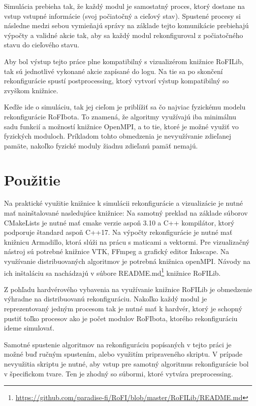 \documentclass[
  digital, %
  oneside, %
  table,   %
  lof,     %
  nolot,     %
]{fithesis3}
\begin{document}
Simulácia prebieha tak, že každý modul je samostatný proces, ktorý dostane na vstup vstupné informácie (svoj počiatočný a cieľový stav). Spustené procesy si následne medzi sebou vymieňajú správy na základe tejto komunikácie prebiehajú výpočty a validné akcie tak, aby sa každý modul rekonfiguroval z počiatočného stavu do cieľového stavu. 

Aby bol výstup tejto práce plne kompatibilný s vizualizérom knižnice RoFILib, tak sú jednotlivé vykonané akcie zapísané do logu. Na tie sa po skončení rekonfigurácie spustí postprocessing, ktorý vytvorí výstup kompatibilný so zvyškom knižnice. 

Keďže ide o simuláciu, tak jej cieľom je priblížiť sa čo najviac fyzickému modelu rekonfigurácie RoFIbota. To znamená, že algoritmy využívajú iba minimálnu sadu funkcií a možností knižnice OpenMPI, a to tie, ktoré je možné využiť vo fyzických moduloch. Príkladom tohto obmedzenia je nevyužívanie zdieľanej pamäte, nakoľko fyzické moduly žiadnu zdieľanú pamäť nemajú. 

\section{Použitie}
Na praktické využitie knižnice k simulácii rekonfigurácie a vizualizácie je nutné mať nainštalované nasledujúce knižnice: Na samotný preklad na základe súborov CMakeLists je nutné mať cmake verzie aspoň 3.10 a C++ kompilátor, ktorý podporuje štandard aspoň C++17. Na výpočty rekonfigurácie je nutné mať knižnicu Armadillo, ktorá slúži na prácu s maticami a vektormi. Pre vizualizačný nástroj sú potrebné knižnice VTK, FFmpeg a grafický editor Inkscape. Na využívanie distribuovaných algoritmov je potrebná knižnica openMPI. Návody na ich inštaláciu sa nachádzajú v súbore README.md\footnote{\url{https://github.com/paradise-fi/RoFI/blob/master/RoFILib/README.md}} knižnice RoFILib. 

Z pohľadu hardvérového vybavenia na využívanie knižnice RoFILib je obmedzenie výhradne na distribuovanú rekonfiguráciu. Nakoľko každý modul je reprezentovaný jedným procesom tak je nutné mať k hardvér, ktorý je schopný pustiť toľko procesov ako je počet modulov RoFIbota, ktorého rekonfiguráciu ideme simulovať. 

Samotné spustenie algoritmov na rekonfiguráciu popísaných v tejto práci je možné buď ručným spustením, alebo využitím pripraveného skriptu. V prípade nevyužitia skriptu je nutné, aby vstup pre samotný algoritmus rekonfigurácie bol v špecifickom tvare. Ten je zhodný so súbormi, ktoré vytvára preprocessing. 
\end{document}
